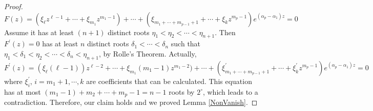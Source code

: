 \begin{proof}
$$F(z)=(\xi_{\ell}z^{\ell-1}+\cdots+\xi_{m_1}z^{m_1-1})+\cdots+(\xi_{m_1+\cdots+m_{p-1}+1}+\cdots+\xi_{k}z^{m_{p}-1})e^{(\alpha_{p}-\alpha_{1})z}=0$$
Assume it has at least $(n+1)$ distinct roots $\eta_{1}<\eta_{2}<\cdots<\eta_{n+1}$. Then $F^{\prime}(z)=0$ has at least $n$ distinct roots $\delta_{1}<\cdots<\delta_{n}$ such that $\eta_{1}<\delta_{1}<\eta_{2}<\cdots<\delta_{n}<\eta_{n+1}$, by Rolle's Theorem. Actually, $F^{\prime}(z)=(\xi_{\ell}(\ell-1))z^{\ell-2}+\cdots+\xi_{m_1}(m_1-1)z^{m_{1}-2})+\cdots+(\xi_{m_1+\cdots+m_{p-1}+1}^{\prime}+\cdots+\xi_{k}^{\prime}z^{m_{p}-1})e^{(\alpha_{p}-\alpha_{1})z}=0$
where $\xi_{i}^{\prime}$, $i=m_1+1,\cdots,k$ are coefficients that can be calculated. This equation has at most $(m_1-1)+m_2+\cdots+m_{p}-1=n-1$ roots by $2^{\circ}$, which leads to a contradiction. Therefore, our claim holds and we proved Lemma \ref{NonVanish}.
\end{proof}


